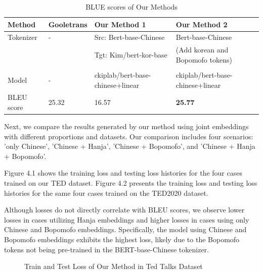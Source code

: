 \documentclass[PhD]{PHlab-thesis}
\begin{document}
\begin{table}
\begin{tabularx}{0.9\linewidth}{p{3cm} p{2cm} p{4cm} p{4cm}}
Method & Gooletrans & Our Method 1 & Our Method 2\\
\toprule
Tokenizer &  - & Src: Bert-base-Chinese 
 & Bert-base-Chinese\\
&& Tgt: Kim/bert-kor-base & (Add korean and Bopomofo tokens)
\\[.3ex]
\\
Model  &   - & ckiplab/bert-base-chinese+linear & ckiplab/bert-base-chinese+linear
 \\[.3ex]
\toprule
BLEU score  &  25.32 & 16.57 & \textbf{25.77}\\
\bottomrule
\end{tabularx}
\caption{BLUE scores of Our Methods}
\label{tab:notation}
\end{table}

Next, we compare the results generated by our method using joint embeddings with different proportions and datasets. Our comparison includes four scenarios: 'only Chinese', 'Chinese + Hanja', 'Chinese + Bopomofo', and 'Chinese + Hanja + Bopomofo'.

Figure 4.1 shows the training loss and testing loss histories for the four cases trained on our TED dataset. Figure 4.2 presents the training loss and testing loss histories for the same four cases trained on the TED2020 dataset.

Although losses do not directly correlate with BLEU scores, we observe lower losses in cases utilizing Hanja embeddings and higher losses in cases using only Chinese and Bopomofo embeddings. Specifically, the model using Chinese and Bopomofo embeddings exhibits the highest loss, likely due to the Bopomofo tokens not being pre-trained in the BERT-base-Chinese tokenizer.

\begin{figure}[h!]
  \centering
  \hfill
  \captionsetup{type=figure}
  \caption{Train and Test Loss of Our Method in Ted Talks Dataset}
  \label{fig:naver dictionary}
\end{figure}
\end{document}
